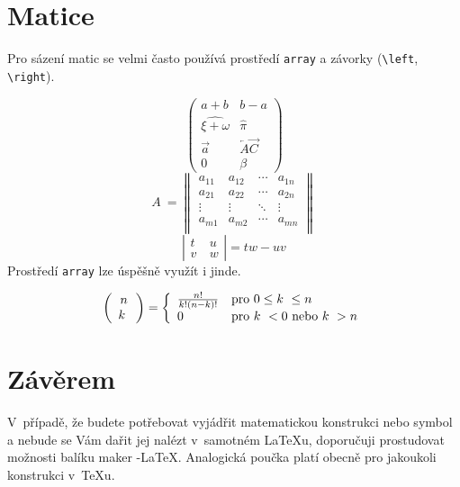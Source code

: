 \documentclass[11pt,a4paper,twocolumn]{article}
\theoremstyle{definition}
\theoremstyle{lemma}
\begin{document}
\section{Matice}
\label{matice}

\noindent Pro sázení matic se velmi často používá prostředí \texttt{array} a závorky (\verb|\left|, \verb|\right|). 

\[
  \left(
  \begin{array}{cc}
  a+b & b-a \\
  \widehat{\xi+\omega} & \hat{\pi} \\
  \vec{a} & \overleftarrow{A}\!\overrightarrow{C} \\
  0 & \beta
\end{array}
\right)
\]
\[ A~= 
  \left\|
  \begin{array}{cccc}
    a_{11} & a_{12} &\cdots &a_{1n}\\
    a_{21} & a_{22} &\cdots &a_{2n}\\
    \vdots & \vdots &\ddots &\vdots\\
    a_{m1} & a_{m2} &\cdots &a_{mn}\\
  \end{array}
  \right\|
\]
\[ \left|
  \begin{array}{cc}
    t & u\\
    v~& w
  \end{array}
  \right|
  =tw-uv
\]
\indent Prostředí \texttt{array} lze úspěšně využít i jinde.

\[
  \left(
  \begin{array}{c}
    n\\
    k~\end{array}
  \right)
  = \left\{
    \begin{array}{l l}
      \frac{n!}{k!(n-k)!} & \text{pro } 0 \leq k~\leq n \\
      0 & \text{pro } k~< 0 \text{ nebo } k~> n
    \end{array}
\right. 
  \]

\section{Závěrem}
\label{zaverem}

\noindent V~případě, že budete potřebovat vyjádřit matematickou konstrukci nebo symbol a nebude
se Vám dařit jej nalézt v~samotném \LaTeX u, doporučuji prostudovat možnosti balíku maker 
\AmS-\LaTeX.
Analogická poučka platí obecně pro jakoukoli konstrukci v~\TeX u.
\end{document}
